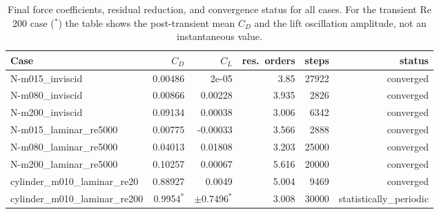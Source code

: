 \begin{table}[H]\centering\small
\begin{tabular}{lrrrrr}
\toprule
Case & $C_D$ & $C_L$ & res.\ orders & steps & status \\
\midrule
N-m015\_inviscid & 0.00486 & 2e-05 & 3.85 & 27922 & converged \\
N-m080\_inviscid & 0.00866 & 0.00228 & 3.935 & 2826 & converged \\
N-m200\_inviscid & 0.09134 & 0.00038 & 3.006 & 6342 & converged \\
N-m015\_laminar\_re5000 & 0.00775 & -0.00033 & 3.566 & 2888 & converged \\
N-m080\_laminar\_re5000 & 0.04013 & 0.01808 & 3.203 & 25000 & converged \\
N-m200\_laminar\_re5000 & 0.10257 & 0.00067 & 5.616 & 20000 & converged \\
cylinder\_m010\_laminar\_re20 & 0.88927 & 0.0049 & 5.004 & 9469 & converged \\
cylinder\_m010\_laminar\_re200 & 0.9954$^{*}$ & $\pm$0.7496$^{*}$ & 3.008 & 30000 & statistically\_periodic \\
\bottomrule
\end{tabular}
\caption{Final force coefficients, residual reduction, and convergence status for all cases. For the transient Re 200 case ($^{*}$) the table shows the post-transient mean $C_D$ and the lift oscillation amplitude, not an instantaneous value.}
\label{tab:results}\end{table}